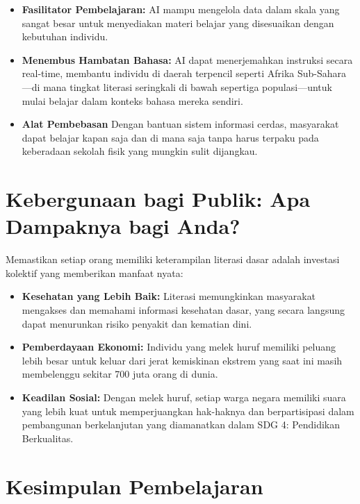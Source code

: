 \documentclass[
  letterpaper,
  DIV=11,
  numbers=noendperiod]{scrreprt}
\begin{document}
\begin{itemize}
\item
  \textbf{Fasilitator Pembelajaran:} AI mampu mengelola data dalam skala
  yang sangat besar untuk menyediakan materi belajar yang disesuaikan
  dengan kebutuhan individu.
\item
  \textbf{Menembus Hambatan Bahasa:} AI dapat menerjemahkan instruksi
  secara real-time, membantu individu di daerah terpencil seperti Afrika
  Sub-Sahara---di mana tingkat literasi seringkali di bawah sepertiga
  populasi---untuk mulai belajar dalam konteks bahasa mereka sendiri.
\item
  \textbf{Alat Pembebasan} Dengan bantuan sistem informasi cerdas,
  masyarakat dapat belajar kapan saja dan di mana saja tanpa harus
  terpaku pada keberadaan sekolah fisik yang mungkin sulit dijangkau.
\end{itemize}

\section{Kebergunaan bagi Publik: Apa Dampaknya bagi
Anda?}\label{kebergunaan-bagi-publik-apa-dampaknya-bagi-anda}

Memastikan setiap orang memiliki keterampilan literasi dasar adalah
investasi kolektif yang memberikan manfaat nyata:

\begin{itemize}
\item
  \textbf{Kesehatan yang Lebih Baik:} Literasi memungkinkan masyarakat
  mengakses dan memahami informasi kesehatan dasar, yang secara langsung
  dapat menurunkan risiko penyakit dan kematian dini.
\item
  \textbf{Pemberdayaan Ekonomi:} Individu yang melek huruf memiliki
  peluang lebih besar untuk keluar dari jerat kemiskinan ekstrem yang
  saat ini masih membelenggu sekitar 700 juta orang di dunia.
\item
  \textbf{Keadilan Sosial:} Dengan melek huruf, setiap warga negara
  memiliki suara yang lebih kuat untuk memperjuangkan hak-haknya dan
  berpartisipasi dalam pembangunan berkelanjutan yang diamanatkan dalam
  SDG 4: Pendidikan Berkualitas.
\end{itemize}

\section{Kesimpulan Pembelajaran}\label{kesimpulan-pembelajaran}
\end{document}
